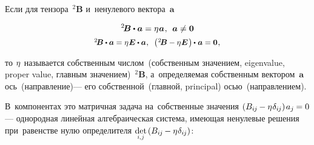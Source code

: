 \begin{otherlanguage}{russian}

Если для тензора~${^2\!\bm{B}}$ и~ненулевого вектора~${\bm{a}}$

\nopagebreak\vspace{-0.24em}\begin{equation}\label{eigenvalues:eq}
^2\!\bm{B} \dotp \bm{a} = \eigenvalue \bm{a} \hspace{.1ex} ,
\:\:
\bm{a} \neq \bm{0}
\end{equation}
\vspace{-1.33em}\[
\scalebox{0.92}[0.92]{${^2\!\bm{B}} \dotp \bm{a} = \eigenvalue \bm{E} \dotp \bm{a} \hspace{.1ex},\;\;
\left(\hspace{.1ex}
{^2\!\bm{B} - \eigenvalue \bm{E}}
\hspace{.2ex}\right) \hspace{-0.1ex} \dotp \hspace{.1ex} \bm{a} = \bm{0}$} \hspace{.1ex},
\]

\vspace{-0.64em} \noindent то $\eta\hspace{.1ex}$ называется собственным числом~(собственным значением, eigenvalue, proper value, главным значением)~${^2\!\bm{B}}$, а~определяемая собственным вектором~$\bm{a}$ ось~(направление)\:--- его собственной~(главной, principal) осью~(направлением).

В~компонентах это матричная задача на~собственные значения ${( B_{i\hspace{-0.1ex}j} \hspace{-0.12ex} - \eta\hspace{.1ex} \delta_{i\hspace{-0.1ex}j} ) \hspace{.25ex} a_j \hspace{-0.1ex} = 0}$\:--- однородная линейная алгебраическая система, имеющая ненулевые решения при~равенстве нулю определителя ${\smash{\underset{\raisebox{.15em}{\scalebox{0.7}{$i$,$\hspace{.15ex}j$}}}{\operatorname{det}}} \hspace{.32ex} ( B_{i\hspace{-0.1ex}j} \hspace{-0.12ex} - \eigenvalue \delta_{i\hspace{-0.1ex}j} )}$:


\end{otherlanguage}
